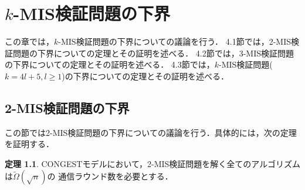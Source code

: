 \documentclass[12pt]{thesis}
\newcommand{\CONGEST}{\textsf{CONGEST}}
\theoremstyle{definition}
\newtheorem{theorem}{定理}[chapter]
\begin{document}
\chapter{$k$-MIS検証問題の下界}
この章では，$k$-MIS検証問題の下界についての議論を行う．
4.1節では，2-MIS検証問題の下界についての定理とその証明を述べる．
4.2節では，3-MIS検証問題の下界についての定理とその証明を述べる．
4.3節では，$k$-MIS検証問題($k = 4l + 5, l \geq 1$)の下界についての定理とその証明を述べる．

\section{2-MIS検証問題の下界}

この節では2-MIS検証問題の下界についての議論を行う．具体的には，次の定理を証明する．
\begin{theorem}
{\CONGEST}モデルにおいて，2-MIS検証問題を解く全てのアルゴリズムは$\tilde{\Omega} (\sqrt{n})$の
通信ラウンド数を必要とする．
\end{theorem}
\end{document}
